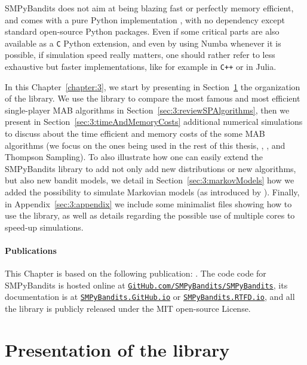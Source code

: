 SMPyBandits does not aim at being blazing fast or perfectly memory efficient, and comes with a pure Python implementation \cite{python}, with no dependency except standard open-source Python packages.
Even if some critical parts are also available as a \texttt{C} Python extension, and even by using Numba \cite{numba} whenever it is possible, if simulation speed really matters, one should rather refer to less exhaustive but faster implementations, like for example \cite{TorLibbandit} in \texttt{C++} or \cite{VishMABjl} in Julia.

In this Chapter~\ref{chapter:3}, we start by presenting in Section~\ref{sec:3:presentationLibrary} the organization of the library.
We use the library to compare the most famous and most efficient single-player MAB algorithms in Section~\ref{sec:3:reviewSPAlgorithms},
then we present in Section~\ref{sec:3:timeAndMemoryCosts} additional numerical simulations to discuss about the time efficient and memory costs of the some MAB algorithms (we focus on the ones being used in the rest of this thesis, \UCB, \klUCB, and Thompson Sampling).
To also illustrate how one can easily extend the SMPyBandits library to add not only add new distributions or new algorithms, but also new bandit models, we detail in Section~\ref{sec:3:markovModels} how we added the possibility to simulate Markovian models (as introduced by \cite{Anantharam87b}).
%
Finally, in Appendix~\ref{sec:3:appendix} we include some minimalist files showing how to use the library, as well as details regarding the possible use of multiple cores to speed-up simulations.


\paragraph{Publications}
%
This Chapter is based on the following publication: \cite{SMPyBanditsJMLR}.
The code code for SMPyBandits is hosted online at \texttt{\href{https://GitHub.com/SMPyBandits/SMPyBandits/}{GitHub.com/SMPyBandits/SMPyBandits}}, its documentation is at \texttt{\href{https://SMPyBandits.GitHub.io/}{SMPyBandits.GitHub.io}} or \texttt{\href{https://SMPyBandits.RTFD.io/}{SMPyBandits.RTFD.io}}, and all the library is publicly released under the MIT open-source License.


\section{Presentation of the library}
\label{sec:3:presentationLibrary}

